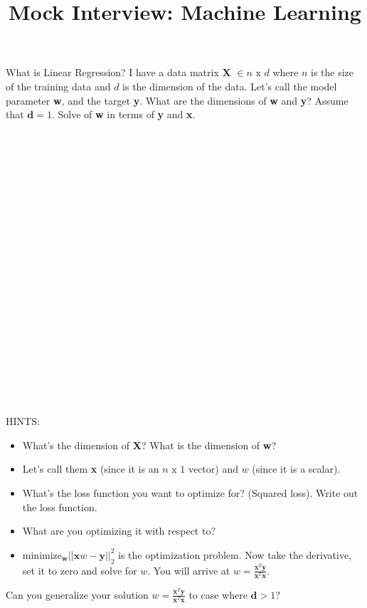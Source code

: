 \documentclass{article}
\title{Mock Interview: Machine Learning}
\date{}
\begin{document}
\maketitle

What is Linear Regression?
\newpage
I have a data matrix \textbf{X} $\in n\text{ x }d $ where $n$ is the size of the training data
		and $d$ is the dimension of the data.  Let's call the model parameter \textbf{w}, and the target \textbf{y}.
		What are the dimensions of \textbf{w} and \textbf{y}?
\newpage
Assume that $\textbf{d} = 1$.  Solve of \textbf{w} in terms of \textbf{y} and \textbf{x}.
\\ \\ \\ \\ \\ \\ \\ \\ \\ \\ \\
\\ \\ \\ \\ \\ \\ \\ \\ \\ \\ \\
\vspace{3cm} 
HINTS: 
\begin{itemize}
		\item What's the dimension of \textbf{X}?  What is the dimension of \textbf{w}?
		\item Let's call them \textbf{x} (since it is an $n \text{ x } 1$ vector) and $w$ (since it is a scalar).
		\item What's the loss function you want to optimize for?  (Squared loss).  Write out the loss function.
		\item What are you optimizing it with respect to?

		\item $\text{minimize}_\textbf{w} ||\textbf{x}w - \textbf{y}||_2^2$ is the optimization problem.  Now take the derivative, set it to zero and solve for $w$.  You will arrive at $w = \frac{\textbf{x}^T\textbf{y}}{\textbf{x}^T\textbf{x}}$.
\end{itemize}
				\newpage
Can you generalize your solution $w = \frac{\textbf{x}^T\textbf{y}}{\textbf{x}^T\textbf{x}}$ to case where $\textbf{d} > 1$?  
\end{document}
